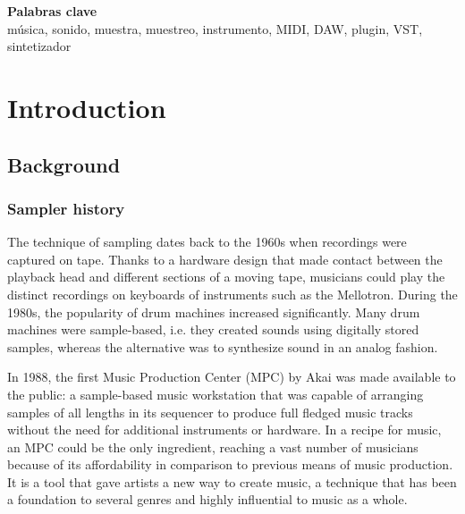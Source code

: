 \documentclass[12pt, a4paper, hidelinks]{article}
\begin{document}
	
	\vspace*{\fill}
	\large
	\textbf{Palabras clave}\\
	
	\vspace{-1em}
	\normalsize	
	\noindent música, sonido, muestra, muestreo, instrumento, MIDI, DAW, plugin, VST, sintetizador
	
	
	
	\newpage
	\tableofcontents


	\newpage
	\section{Introduction}
	\subsection{Background}
	\subsubsection{Sampler history}
	The technique of sampling dates back to the 1960s when recordings were captured on tape. Thanks to a hardware design that made contact between the playback head and different sections of a moving tape, musicians could play the distinct recordings on keyboards of instruments such as the Mellotron. During the 1980s, the popularity of drum machines increased significantly. Many drum machines were sample-based, i.e. they created sounds using digitally stored samples, whereas the alternative was to synthesize sound in an analog fashion. \par
	In 1988, the first Music Production Center (MPC) by Akai was made available to the public: a sample-based music workstation that was capable of arranging samples of all lengths in its sequencer to produce full fledged music tracks without the need for additional instruments or hardware. In a recipe for music, an MPC could be the only ingredient, reaching a vast number of musicians because of its affordability in comparison to previous means of music production. It is a tool that gave artists a new way to create music, a technique that has been a foundation to several genres and highly influential to music as a whole.\par
	
\end{document}
